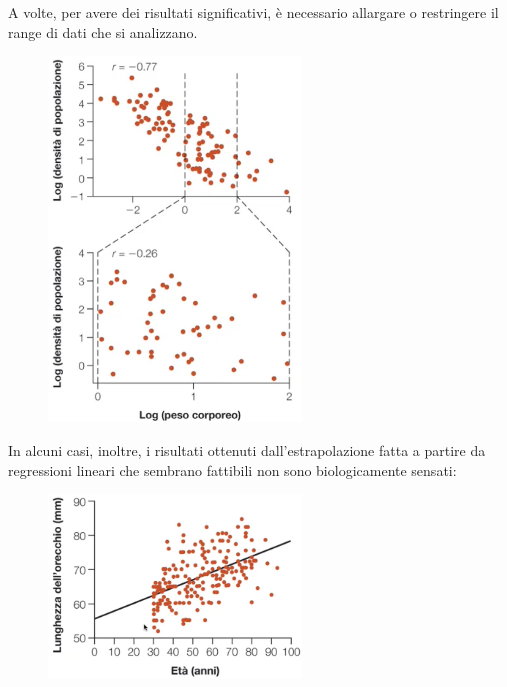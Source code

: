 \documentclass[10pt, draft]{book}
\begin{document}
A volte, per avere dei risultati significativi, è necessario allargare o restringere il range di dati che si analizzano.
\begin{figure}[H]
    \centering
    \includegraphics[width=0.6\textwidth]{figrange}
    \caption{\small{}}
    \label{figrange}
\end{figure}

In alcuni casi, inoltre, i risultati ottenuti dall'estrapolazione fatta a partire da regressioni lineari che sembrano fattibili non sono biologicamente sensati:
\begin{figure}[H]
    \centering
    \includegraphics[width=0.6\textwidth]{fig17.2-2}
    \caption{\small{}}
    \label{fig17.2-2}
\end{figure}

\end{document}
